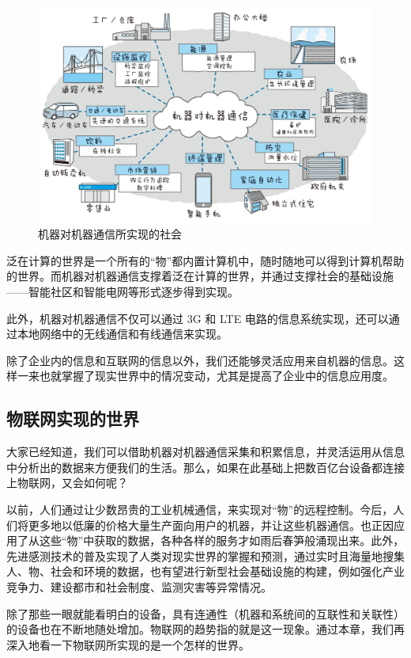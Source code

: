 \documentclass[12pt,UTF8]{ctexbook}
\begin{document}
\begin{figure}[htbp]
	\centering
	\includegraphics[width=1\linewidth]{4}
	\caption{机器对机器通信所实现的社会}
	\label{fig:1}
\end{figure}

泛在计算的世界是一个所有的“物”都内置计算机中，随时随地可以得到计算机帮助的世界。而机器对机器通信支撑着泛在计算的世界，并通过支撑社会的基础设施——智能社区和智能电网等形式逐步得到实现。

此外，机器对机器通信不仅可以通过 3G 和 LTE 电路的信息系统实现，还可以通过本地网络中的无线通信和有线通信来实现。

除了企业内的信息和互联网的信息以外，我们还能够灵活应用来自机器的信息。这样一来也就掌握了现实世界中的情况变动，尤其是提高了企业中的信息应用度。

\subsection{物联网实现的世界}

大家已经知道，我们可以借助机器对机器通信采集和积累信息，并灵活运用从信息中分析出的数据来方便我们的生活。那么，如果在此基础上把数百亿台设备都连接上物联网，又会如何呢？

以前，人们通过让少数昂贵的工业机械通信，来实现对“物”的远程控制。今后，人们将更多地以低廉的价格大量生产面向用户的机器，并让这些机器通信。也正因应用了从这些“物”中获取的数据，各种各样的服务才如雨后春笋般涌现出来。此外，先进感测技术的普及实现了人类对现实世界的掌握和预测，通过实时且海量地搜集人、物、社会和环境的数据，也有望进行新型社会基础设施的构建，例如强化产业竞争力、建设都市和社会制度、监测灾害等异常情况。

除了那些一眼就能看明白的设备，具有连通性（机器和系统间的互联性和关联性）的设备也在不断地随处增加。物联网的趋势指的就是这一现象。通过本章，我们再深入地看一下物联网所实现的是一个怎样的世界。
\end{document}

